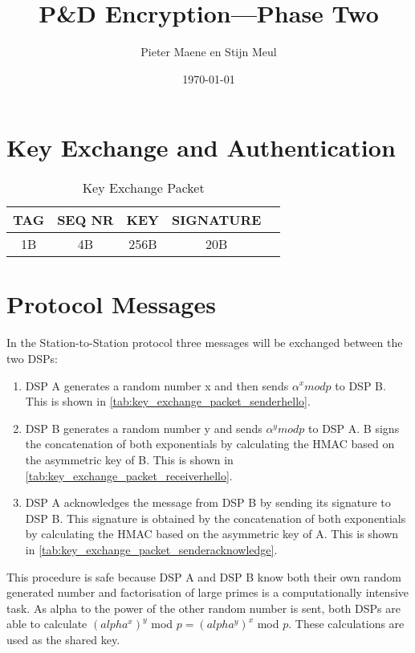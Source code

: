 \documentclass[a4paper]{article}
\title{P\&D Encryption---Phase Two}
\author{Pieter Maene en Stijn Meul}
\date{\today}
\begin{document}
\maketitle

\section{Key Exchange and Authentication}

\begin{table}[H]
    \begin{center}
        \begin{tabular}{| c | c | c | c | c |}
            \hline
            TAG & SEQ NR & KEY & SIGNATURE \\ \hline
            1B & 4B & 256B & 20B \\
            \hline
        \end{tabular}
    \end{center}
    
    \caption{Key Exchange Packet}
    \label{tab:key_exchange_packet}
\end{table}

\section{Protocol Messages}
In the Station-to-Station protocol three messages will be exchanged between the two DSPs:

\begin{enumerate}
 \item DSP A generates a random number x and then sends $\alpha^x mod p$ to DSP B. This is shown in \ref{tab:key_exchange_packet_senderhello}.
 \item DSP B generates a random number y and sends $\alpha^y mod p$ to DSP A. B signs the concatenation of both exponentials by calculating the HMAC based on the asymmetric key of B. This is shown in \ref{tab:key_exchange_packet_receiverhello}.
 \item DSP A acknowledges the message from DSP B by sending its signature to DSP B. This signature is obtained by the concatenation of both exponentials by calculating the HMAC based on the asymmetric key of A. This is shown in \ref{tab:key_exchange_packet_senderacknowledge}.
\end{enumerate}
This procedure is safe because DSP A and DSP B know both their own random generated number and factorisation of large primes is a computationally intensive task. As alpha to the power of the other random number is sent, both DSPs are able to calculate $\left(alpha^{x}\right)^{y}$ mod $p = \left(alpha^{y}\right)^{x}$ mod $p$. These calculations are used as the shared key.
\end{document}
